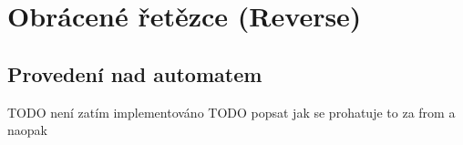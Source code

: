 \section{Obrácené řetězce (Reverse)}
\subsection{Provedení nad automatem}
TODO není zatím implementováno
TODO popsat jak se prohatuje to za from a naopak

